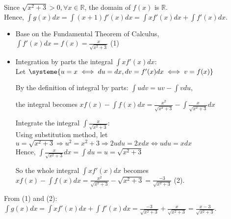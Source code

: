 \documentclass{article}
\begin{document}
    Since $\displaystyle \sqrt{x^2 + 3} > 0, \forall x \in \mathbb{R}$, the domain of $f(x)$ is $\mathbb{R}$.\\

    Hence, $\displaystyle \int g(x) dx = \int (x + 1)f'(x) dx = \int xf'(x) dx + \int f'(x) dx$.\\

    \begin{itemize}
        \item Base on the Fundamental Theorem of Calculus,\\

        $\displaystyle \int f'(x) dx = f(x) = \frac{x}{\sqrt{x^2 + 3}}$ (1)\label{problem3-1}

        \item
        Integration by parts the integral $\displaystyle \int xf'(x) dx$:\\

        Let $\systeme{u = x \iff du = dx, dv = f'(x) dx \iff v = f(x)}$

        By the definition of integral by parts:
        $\displaystyle \int u dv = uv - \int v du$,

        the integral becomes $\displaystyle xf(x) - \int f(x) dx = \frac{x^2}{\sqrt{x^2 + 3}} - \int \frac{x}{\sqrt{x^2 + 3}} dx$

        \subitem
        Integrate the integral $\displaystyle\int \frac{x}{\sqrt{x^2 + 3}}$:\\

        Using substitution method, let $\displaystyle u = \sqrt{x^2 + 3} \Rightarrow u^2 = x^2 + 3 \Rightarrow 2udu = 2xdx \iff udu = xdx$\\

        Hence, $\displaystyle \int \frac{x}{\sqrt{x^2 + 3}} dx = \int du = u = \sqrt{x^2 + 3}$

        So the whole integral $\displaystyle \int xf'(x) dx$ becomes $\displaystyle xf(x) - \int f(x) dx = \frac{x^2}{\sqrt{x^2 + 3}} - \sqrt{x^2 + 3} = \frac{-3}{\sqrt{x^2 + 3}}$ (2)\label{problem3-2}.\\
    \end{itemize}

    From (1) and (2):\\

    $\displaystyle \int g(x) dx = \int xf'(x) dx + \int f'(x) dx = \frac{-3}{\sqrt{x^2 + 3}} + \frac{x}{\sqrt{x^2 + 3}} = \frac{x - 3}{\sqrt{x^2 + 3}}$.\\
\end{document}

